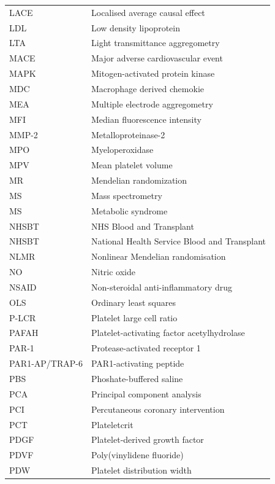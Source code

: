 \documentclass[11pt,twoside]{bristolthesis}
\begin{document}
\begin{abbreviations}
\begin{longtable}[t]{ll}
    \addlinespace
    LACE & Localised average causal effect\\
    LDL & Low density lipoprotein\\
    LTA & Light transmittance aggregometry\\
    MACE & Major adverse cardiovascular event\\
    MAPK & Mitogen-activated protein kinase\\
    \addlinespace
    MDC & Macrophage derived chemokie\\
    MEA & Multiple electrode aggregometry\\
    MFI & Median fluorescence intensity\\
    MMP-2 & Metalloproteinase-2\\
    MPO & Myeloperoxidase\\
    \addlinespace
    MPV & Mean platelet volume\\
    MR & Mendelian randomization\\
    MS & Mass spectrometry\\
    MS & Metabolic syndrome\\
    NHSBT & NHS Blood and Transplant\\
    \addlinespace
    NHSBT & National Health Service Blood and Transplant\\
    NLMR & Nonlinear Mendelian randomisation\\
    NO & Nitric oxide\\
    NSAID & Non-steroidal anti-inflammatory drug\\
    OLS & Ordinary least squares\\
    \addlinespace
    P-LCR & Platelet large cell ratio\\
    PAFAH & Platelet-activating factor acetylhydrolase\\
    PAR-1 & Protease-activated receptor 1\\
    PAR1-AP/TRAP-6 & PAR1-activating peptide\\
    PBS & Phoshate-buffered saline\\
    \addlinespace
    PCA & Principal component analysis\\
    PCI & Percutaneous coronary intervention\\
    PCT & Plateletcrit\\
    PDGF & Platelet-derived growth factor\\
    PDVF & Poly(vinylidene fluoride)\\
    \addlinespace
    PDW & Platelet distribution width\\

\end{longtable}
\end{abbreviations}
\end{document}
